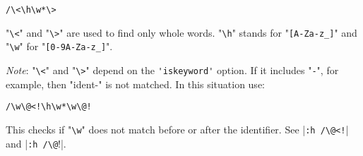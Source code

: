 \begin{Verbatim}[samepage=true]
 /\<\h\w*\>
\end{Verbatim}

"\verb!\<!" and "\verb!\>!" are used to find only whole words.
"\verb!\h!" stands for "\verb![A-Za-z_]!" and "\verb!\w!" for "\verb![0-9A-Za-z_]!".

\emph{Note}:
"\verb!\<!" and "\verb!\>!" depend on the \verb!'iskeyword'! option.
If it includes "\verb!-!", for example, then "ident-" is not matched.
In this situation use:

\begin{Verbatim}[samepage=true]
     /\w\@<!\h\w*\w\@!
\end{Verbatim}
 
This checks if "\verb!\w!" does not match before or after the identifier.
See |\verb$:h /\@<!$| and |\verb!:h /\@!!|.
\clearpage
